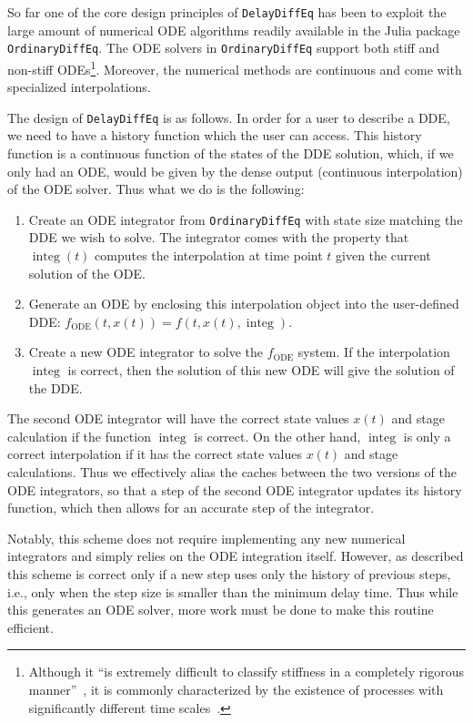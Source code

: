 \documentclass{juliacon}
\def\pkg#1{\texttt{#1}}
\begin{document}
So far one of the core design principles of \pkg{DelayDiffEq} has been to exploit
the large amount of numerical ODE algorithms readily available in the Julia
package \pkg{OrdinaryDiffEq}. The ODE solvers in \pkg{OrdinaryDiffEq} support both stiff
and non-stiff ODEs\footnote{Although it
``is extremely difficult to classify stiffness in a completely rigorous manner''~\cite{burrage95_parallel_sequential_methods},
it is commonly characterized by the existence of processes with significantly different time
scales~\cite{burrage95_parallel_sequential_methods,dahlquist75_recent_work_stiff}.}.
Moreover, the numerical methods are continuous and come with specialized interpolations.

The design of \pkg{DelayDiffEq} is as follows. In order for a user to describe a DDE, we need
to have a history function which the user can access. This history function is a continuous
function of the states of the DDE solution, which, if we only had an ODE, would be given
by the dense output (continuous interpolation) of the ODE solver. Thus what we do is the
following:

\begin{enumerate}
    \item Create an ODE integrator from \pkg{OrdinaryDiffEq} with state size matching the DDE we wish to solve. The integrator comes with the property that $\operatorname{integ}(t)$ computes the interpolation at time point $t$ given the current solution of the ODE.
    \item Generate an ODE by enclosing this interpolation object into the user-defined DDE: $f_{\text{ODE}}(t,x(t)) = f(t,x(t),\operatorname{integ})$.
    \item Create a new ODE integrator to solve the $f_{\text{ODE}}$ system. If the interpolation $\operatorname{integ}$ is correct, then the solution of this new ODE will give the solution of the DDE.
\end{enumerate}

The second ODE integrator will have the correct state values $x(t)$ and stage calculation if the function $\operatorname{integ}$ is correct.
On the other hand, $\operatorname{integ}$ is only a correct interpolation if it has the correct state values $x(t)$ and stage calculations.
Thus we effectively alias the caches between the two versions of the ODE integrators, so that a step of the second ODE integrator updates its history function, which then allows for an accurate step of the integrator.

Notably, this scheme does not require implementing any new numerical integrators and simply relies on the ODE integration itself.
However, as described this scheme is correct only if a new step uses only the history of previous steps, i.e., only when the step size is smaller than the minimum delay time.
Thus while this generates an ODE solver, more work must be done to make this routine efficient.
\end{document}
